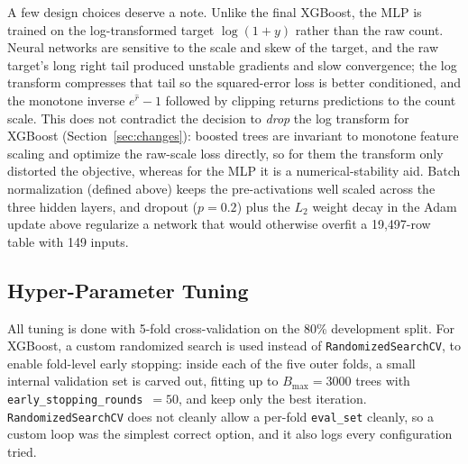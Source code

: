 \documentclass[journal]{IEEEtran}
\begin{document}
A few design choices deserve a note. Unlike the final XGBoost, the MLP is
trained on the log-transformed target $\log(1+y)$ rather than the raw count.
Neural networks are sensitive to the scale and skew of the target, and the raw
target's long right tail produced unstable gradients and slow convergence; the
log transform compresses that tail so the squared-error loss is better
conditioned, and the monotone inverse $e^{\hat r}-1$ followed by clipping returns
predictions to the count scale. This does not contradict the decision to
\emph{drop} the log transform for XGBoost (Section~\ref{sec:changes}): boosted
trees are invariant to monotone feature scaling and optimize the raw-scale loss
directly, so for them the transform only distorted the objective, whereas for the
MLP it is a numerical-stability aid. Batch normalization
(defined above) keeps the pre-activations well scaled across the three hidden
layers, and dropout ($p=0.2$) plus the $L_2$ weight decay in the Adam update
above regularize a network that would otherwise overfit a 19{,}497-row table with 149
inputs.

\subsection{Hyper-Parameter Tuning}
\label{sec:tuning}
All tuning is done with 5-fold cross-validation on the 80\% development split.
For XGBoost, a custom randomized search is used instead of
\texttt{RandomizedSearchCV}, to enable fold-level early stopping: inside
each of the five outer folds, a small internal validation set is carved out, fitting
up to $B_{\max}=3000$ trees with \texttt{early\_stopping\_rounds}~$=50$, and keep
only the best iteration. \texttt{RandomizedSearchCV} does not cleanly allow a
per-fold \texttt{eval\_set} cleanly, so a custom loop was the simplest correct
option, and it also logs every configuration tried.
\end{document}
